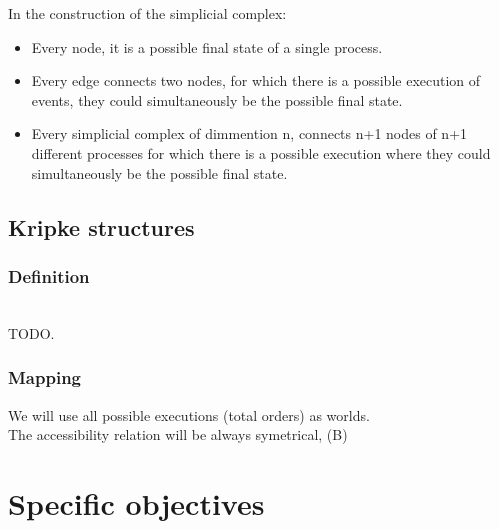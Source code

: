 \documentclass{tufte-book} %
\begin{document}

In the construction of the simplicial complex:
\begin{itemize} 
\item Every node, it is a possible final state of a single process.
\item Every edge connects two nodes, for which there is a possible execution of events, they could simultaneously be the possible final state.
\item Every simplicial complex of dimmention n, connects n+1 nodes of n+1 different processes for which there is a possible execution where they could simultaneously be the possible final state.
\end{itemize}


\subsection{Kripke structures}

\subsubsection{Definition}\\

TODO.
\newpage

\subsubsection{Mapping}

We will use all possible executions (total orders) as worlds.\\

The accessibility relation will be always symetrical, (B)

\section{Specific objectives}


\backmatter




\end{document}

